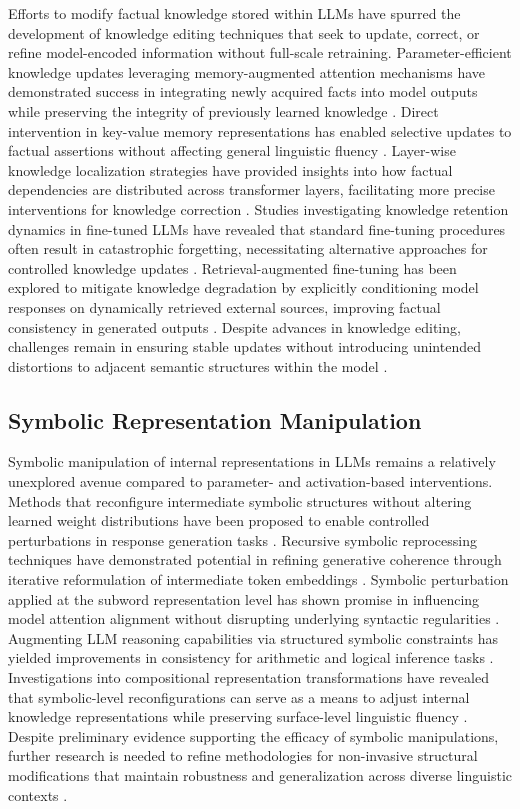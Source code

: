 Efforts to modify factual knowledge stored within LLMs have spurred the development of knowledge editing techniques that seek to update, correct, or refine model-encoded information without full-scale retraining. Parameter-efficient knowledge updates leveraging memory-augmented attention mechanisms have demonstrated success in integrating newly acquired facts into model outputs while preserving the integrity of previously learned knowledge \cite{ zollner2024technical}. Direct intervention in key-value memory representations has enabled selective updates to factual assertions without affecting general linguistic fluency \cite{barbere2024dynamic}. Layer-wise knowledge localization strategies have provided insights into how factual dependencies are distributed across transformer layers, facilitating more precise interventions for knowledge correction \cite{fa2024modality}. Studies investigating knowledge retention dynamics in fine-tuned LLMs have revealed that standard fine-tuning procedures often result in catastrophic forgetting, necessitating alternative approaches for controlled knowledge updates \cite{zahmad2024probabilistic}. Retrieval-augmented fine-tuning has been explored to mitigate knowledge degradation by explicitly conditioning model responses on dynamically retrieved external sources, improving factual consistency in generated outputs \cite{ono2024evaluating}. Despite advances in knowledge editing, challenges remain in ensuring stable updates without introducing unintended distortions to adjacent semantic structures within the model \cite{beard2024adaptive}.

\subsection{Symbolic Representation Manipulation}

Symbolic manipulation of internal representations in LLMs remains a relatively unexplored avenue compared to parameter- and activation-based interventions. Methods that reconfigure intermediate symbolic structures without altering learned weight distributions have been proposed to enable controlled perturbations in response generation tasks \cite{shofman2024negative}. Recursive symbolic reprocessing techniques have demonstrated potential in refining generative coherence through iterative reformulation of intermediate token embeddings \cite{slaten2024probabilistic}. Symbolic perturbation applied at the subword representation level has shown promise in influencing model attention alignment without disrupting underlying syntactic regularities \cite{anderson2024semantic}. Augmenting LLM reasoning capabilities via structured symbolic constraints has yielded improvements in consistency for arithmetic and logical inference tasks \cite{hawthorne2024enhancing}. Investigations into compositional representation transformations have revealed that symbolic-level reconfigurations can serve as a means to adjust internal knowledge representations while preserving surface-level linguistic fluency \cite{zhang2024unified}. Despite preliminary evidence supporting the efficacy of symbolic manipulations, further research is needed to refine methodologies for non-invasive structural modifications that maintain robustness and generalization across diverse linguistic contexts \cite{davies2024boosting}.